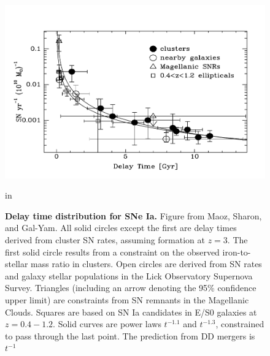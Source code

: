 \documentclass{nature1}
\begin{document}
\begin{figure}
\includegraphics[width=7in]{maozdtd.pdf} 
\caption{\textsf{{\bf \textsf{Delay time distribution for SNe Ia.}}  Figure from Maoz,
  Sharon, and Gal-Yam\citep{2010ApJ...722.1879M}.  All solid circles
  except the first are delay times derived from cluster SN rates,
  assuming formation at $z=3$.  The first solid circle results from a
  constraint on the observed iron-to-stellar mass ratio in clusters.
  Open circles are derived from SN rates and galaxy stellar
  populations in the Lick Observatory Supernova
  Survey\citep{2010arXiv1002.3056M}.  Triangles (including an arrow
  denoting the 95\% confidence upper limit) are constraints from SN
  remnants in the Magellanic Clouds.  Squares are based on SN Ia
  candidates in E/S0 galaxies at
  $z=0.4-1.2$\citep{2008PASJ...60.1327T}. Solid curves are power laws
  $t^{-1.1}$ and $t^{-1.3}$, constrained to pass through the last
  point.  The prediction\citep{2005A&A...441.1055G} from DD mergers is
  $t^{-1}$}}
\label{maoz}
 in
\end{figure}
\end{document}

